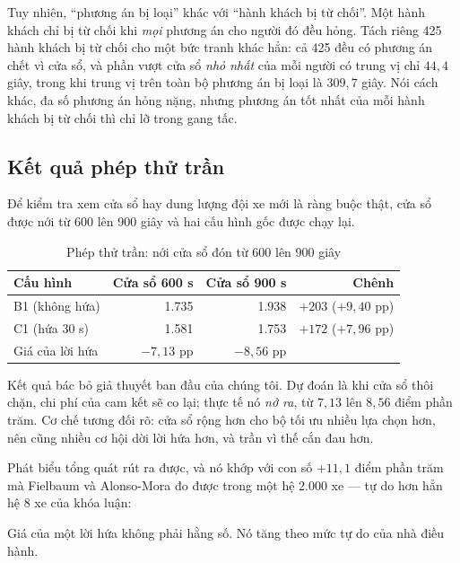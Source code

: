 Tuy nhiên, ``phương án bị loại'' khác với ``hành khách bị từ chối''. Một hành khách chỉ bị từ
chối khi \emph{mọi} phương án cho người đó đều hỏng. Tách riêng 425 hành khách bị từ chối cho
một bức tranh khác hẳn: cả 425 đều có phương án chết vì cửa sổ, và phần vượt cửa sổ \emph{nhỏ
nhất} của mỗi người có trung vị chỉ $44{,}4$ giây, trong khi trung vị trên toàn bộ phương án bị
loại là $309{,}7$ giây. Nói cách khác, đa số phương án hỏng nặng, nhưng phương án tốt nhất của
mỗi hành khách bị từ chối thì chỉ lỡ trong gang tấc.

\subsection{Kết quả phép thử trần}

Để kiểm tra xem cửa sổ hay dung lượng đội xe mới là ràng buộc thật, cửa sổ được nới từ 600 lên
900 giây và hai cấu hình gốc được chạy lại.

\begin{table}[htbp]
\centering
\caption{Phép thử trần: nới cửa sổ đón từ 600 lên 900 giây}
\label{bang:tran}
\small
\begin{tabular}{@{}lrrr@{}}
\toprule
\textbf{Cấu hình} & \textbf{Cửa sổ 600 s} & \textbf{Cửa sổ 900 s} & \textbf{Chênh}\\
\midrule
B1 (không hứa) & 1.735 & 1.938 & $+203$ ($+9{,}40$ pp)\\
C1 (hứa 30 s) & 1.581 & 1.753 & $+172$ ($+7{,}96$ pp)\\
\midrule
Giá của lời hứa & $-7{,}13$ pp & $-8{,}56$ pp & \\
\bottomrule
\end{tabular}
\end{table}

Kết quả bác bỏ giả thuyết ban đầu của chúng tôi. Dự đoán là khi cửa sổ thôi chặn, chi phí của
cam kết sẽ co lại; thực tế nó \emph{nở ra}, từ $7{,}13$ lên $8{,}56$ điểm phần trăm. Cơ chế
tương đối rõ: cửa sổ rộng hơn cho bộ tối ưu nhiều lựa chọn hơn, nên cũng nhiều cơ hội dời lời
hứa hơn, và trần vì thế cắn đau hơn.

Phát biểu tổng quát rút ra được, và nó khớp với con số $+11{,}1$ điểm phần trăm mà Fielbaum và
Alonso-Mora đo được trong một hệ 2.000 xe --- tự do hơn hẳn hệ 8 xe của khóa luận:

\begin{khungy}
Giá của một lời hứa không phải hằng số. Nó tăng theo mức tự do của nhà điều hành.
\end{khungy}

